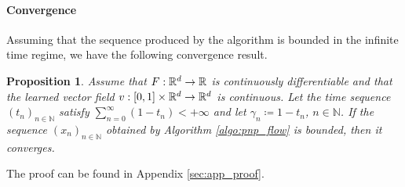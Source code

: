 \documentclass{article} %
\newcommand{\N}{\mathbb{N}}	%
\newtheorem{proposition}[theorem]{Proposition}
\theoremstyle{definition}
\begin{document}
\paragraph{Convergence}
Assuming that the sequence produced by the algorithm is bounded in the infinite time regime, we have the following convergence result.
\begin{proposition}\label{prop:convergence}
Assume that $F: \mathbb{R}^d \to \mathbb{R}$ is continuously differentiable
and that the learned vector field $v: [0,1] \times \mathbb{R}^d  \rightarrow \mathbb{R}^d$
is continuous.
Let the time sequence $(t_n)_{n \in \N}$ satisfy $\sum_{n=0}^\infty (1-t_n) < +\infty $ and let $\gamma_n \coloneqq 1-t_n$, $n \in \N$. 
If the sequence $(x_n)_{n\in \N}$  obtained by Algorithm \ref{algo:pnp_flow} is bounded, then it converges.
\end{proposition}
The proof can be found in Appendix \ref{sec:app_proof}.

\end{document}
